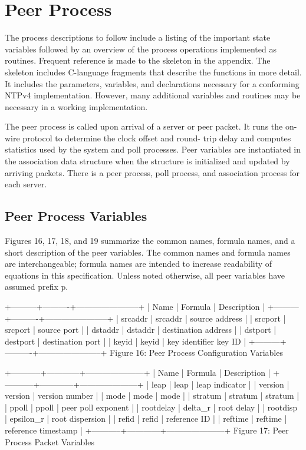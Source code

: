 \chapter{Peer Process}

The process descriptions to follow include a listing of the important
state variables followed by an overview of the process operations
implemented as routines. Frequent reference is made to the skeleton
in the appendix. The skeleton includes C-language fragments that
describe the functions in more detail. It includes the parameters,
variables, and declarations necessary for a conforming NTPv4
implementation. However, many additional variables and routines may
be necessary in a working implementation.

The peer process is called upon arrival of a server or peer packet.
It runs the on-wire protocol to determine the clock offset and round-
trip delay and computes statistics used by the system and poll
processes. Peer variables are instantiated in the association data
structure when the structure is initialized and updated by arriving
packets. There is a peer process, poll process, and association
process for each server.

\section{Peer Process Variables}

Figures 16, 17, 18, and 19 summarize the common names, formula names,
and a short description of the peer variables. The common names and
formula names are interchangeable; formula names are intended to
increase readability of equations in this specification. Unless
noted otherwise, all peer variables have assumed prefix p.

+---------+----------+-----------------------+
| Name | Formula | Description |
+---------+----------+-----------------------+
| srcaddr | srcaddr | source address |
| srcport | srcport | source port |
| dstaddr | dstaddr | destination address |
| dstport | destport | destination port |
| keyid | keyid | key identifier key ID |
+---------+----------+-----------------------+
Figure 16: Peer Process Configuration Variables

+-----------+------------+---------------------+
| Name | Formula | Description |
+-----------+------------+---------------------+
| leap | leap | leap indicator |
| version | version | version number |
| mode | mode | mode |
| stratum | stratum | stratum |
| ppoll | ppoll | peer poll exponent |
| rootdelay | delta_r | root delay |
| rootdisp | epsilon_r | root dispersion |
| refid | refid | reference ID |
| reftime | reftime | reference timestamp |
+-----------+------------+---------------------+
Figure 17: Peer Process Packet Variables

